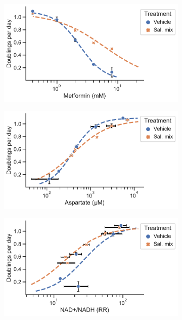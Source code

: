 \begin{figure}[ht]
     \centering
     \begin{subfigure}[b]{0.49\textwidth}
         \includegraphics[width=\textwidth]{figures/chap2/app/H1299_Met_Met_vs_prlfr.pdf}
         \caption{}
         \label{fig:app_ch2:H1299_Met_Met_vs_prlfr}
     \end{subfigure}
     \hspace{0.255\textwidth}
     \begin{subfigure}[b]{0.49\textwidth}
         \includegraphics[width=\textwidth]{figures/chap2/app/H1299_Met_Asp_vs_prlfr.pdf}
         \caption{}
         \label{fig:app_ch2:H1299_Met_Asp_vs_prlfr}
     \end{subfigure}
     \hfill
     \begin{subfigure}[b]{0.49\textwidth}
         \includegraphics[width=\textwidth]{figures/chap2/app/H1299_Met_NAD_vs_prlfr.pdf}

\end{subfigure}
\end{figure}
